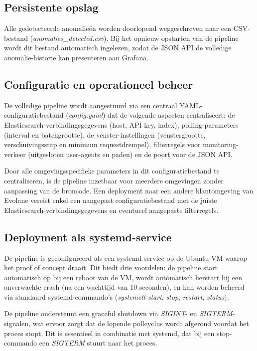\subsection{Persistente opslag} 
\label{subsec:persistente-opslag}

Alle gedetecteerde anomalieën worden doorlopend weggeschreven naar een CSV-bestand (\textit{anomalies\_detected.csv}). Bij het opnieuw opstarten van de pipeline wordt dit bestand automatisch ingelezen, zodat de JSON API de volledige anomalie-historie kan presenteren aan Grafana.

\subsection{Configuratie en operationeel beheer}
\label{subsec:configuratie-operationeel-beheer}
 
De volledige pipeline wordt aangestuurd via een centraal YAML-configuratiebestand (\textit{config.yaml}) dat de volgende aspecten centraliseert: de Elasticsearch-verbindingsgegevens (host, API key, index), polling-parameters (interval en batchgrootte), de venster-instellingen (venstergrootte, verschuivingsstap en minimum requestdrempel), filterregels voor monitoring-verkeer (uitgesloten user-agents en paden) en de poort voor de JSON API.
 
Door alle omgevingsspecifieke parameters in dit configuratiebestand te centraliseren, is de pipeline inzetbaar voor meerdere omgevingen zonder aanpassing van de broncode. Een deployment naar een andere klantomgeving van Evolane vereist enkel een aangepast configuratiebestand met de juiste Elasticsearch-verbindingsgegevens en eventueel aangepaste filterregels.
 
\subsection{Deployment als systemd-service}
\label{subsec:deployment-systemd}
 
De pipeline is geconfigureerd als een systemd-service op de Ubuntu VM waarop het proof of concept draait. Dit biedt drie voordelen: de pipeline start automatisch op bij een reboot van de VM, wordt automatisch herstart bij een onverwachte crash (na een wachttijd van 10 seconden), en kan worden beheerd via standaard systemd-commando's (\textit{systemctl start}, \textit{stop}, \textit{restart}, \textit{status}).
 
De pipeline ondersteunt een graceful shutdown via \textit{SIGINT}- en \textit{SIGTERM}-signalen, wat ervoor zorgt dat de lopende pollcyclus wordt afgerond voordat het proces stopt. Dit is essentieel in combinatie met systemd, dat bij een stop-commando een \textit{SIGTERM} stuurt naar het proces.